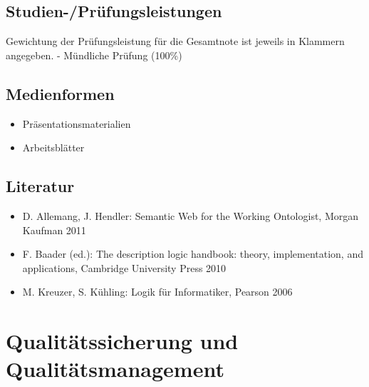 \section*{Studien-/Prüfungsleistungen\label{/mi-2017/modulbeschreibungen-master/MA_WTW_Modul_Logik-und-semantische-Modellierung}}\label{studien-pruxfcfungsleistungenpathlabelmi-2017modulbeschreibungen-mastermaux5fwtwux5fmodulux5flogik-und-semantische-modellierung}

Gewichtung der Prüfungsleistung für die Gesamtnote ist jeweils in
Klammern angegeben. - Mündliche Prüfung (100\%)

\section*{Medienformen\label{/mi-2017/modulbeschreibungen-master/MA_WTW_Modul_Logik-und-semantische-Modellierung}}\label{medienformenpathlabelmi-2017modulbeschreibungen-mastermaux5fwtwux5fmodulux5flogik-und-semantische-modellierung}

\begin{itemize}
\tightlist
\item
  Präsentationsmaterialien
\item
  Arbeitsblätter
\end{itemize}

\section*{Literatur\label{/mi-2017/modulbeschreibungen-master/MA_WTW_Modul_Logik-und-semantische-Modellierung}}\label{literaturpathlabelmi-2017modulbeschreibungen-mastermaux5fwtwux5fmodulux5flogik-und-semantische-modellierung}

\begin{itemize}
\tightlist
\item
  D. Allemang, J. Hendler: Semantic Web for the Working Ontologist,
  Morgan Kaufman 2011
\item
  F. Baader (ed.): The description logic handbook: theory,
  implementation, and applications, Cambridge University Press 2010
\item
  M. Kreuzer, S. Kühling: Logik für Informatiker, Pearson 2006
\end{itemize}

\chapter{Qualitätssicherung und
Qualitätsmanagement\label{/mi-2017/modulbeschreibungen-master/MA_WTW_Modul_QUS_Winter}}\label{qualituxe4tssicherung-und-qualituxe4tsmanagementpathlabelmi-2017modulbeschreibungen-mastermaux5fwtwux5fmodulux5fqusux5fwinter}

